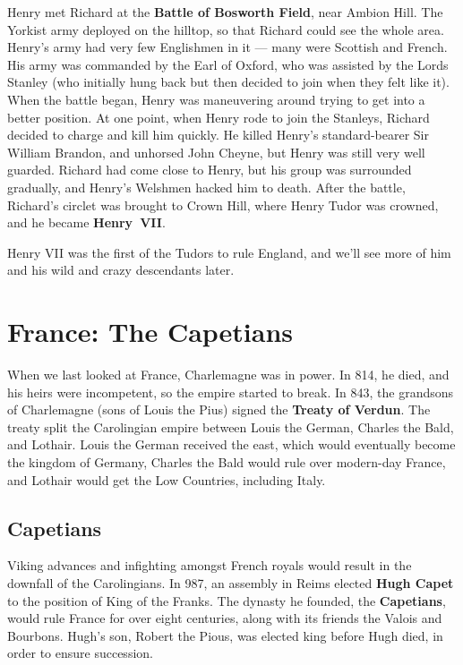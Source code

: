 Henry met Richard at the \textbf{Battle of Bosworth Field}, near Ambion Hill.
The Yorkist army deployed on the hilltop, so that Richard could see the whole area.
Henry's army had very few Englishmen in it --- many were Scottish and French.
His army was commanded by the Earl of Oxford, who was assisted by the Lords Stanley
(who initially hung back but then decided to join when they felt like it).
When the battle began, Henry was maneuvering around trying to get into a better position.
At one point, when Henry rode to join the Stanleys, Richard decided to charge and kill him quickly.
He killed Henry's standard-bearer Sir William Brandon, and unhorsed John Cheyne,
but Henry was still very well guarded.
Richard had come close to Henry, but his group was surrounded gradually,
and Henry's Welshmen hacked him to death.
After the battle, Richard's circlet was brought to Crown Hill,
where Henry Tudor was crowned, and he became \textbf{Henry~VII}\@.

Henry VII was the first of the Tudors to rule England,
and we'll see more of him and his wild and crazy descendants later.

\section{France: The Capetians}

When we last looked at France, Charlemagne was in power.
In 814, he died, and his heirs were incompetent, so the empire started to break.
In 843, the grandsons of Charlemagne (sons of Louis the Pius) signed the \textbf{Treaty of Verdun}.
The treaty split the Carolingian empire between Louis the German, Charles the Bald, and Lothair.
Louis the German received the east, which would eventually become the kingdom of Germany,
Charles the Bald would rule over modern-day France,
and Lothair would get the Low Countries, including Italy.

\subsection*{Capetians}

Viking advances and infighting amongst French royals would result in the downfall of the Carolingians.
In 987, an assembly in Reims elected \textbf{Hugh Capet} to the position of King of the Franks.
The dynasty he founded, the \textbf{Capetians}, would rule France for over eight centuries,
along with its friends the Valois and Bourbons.
Hugh's son, Robert the Pious, was elected king before Hugh died, in order to ensure succession.

